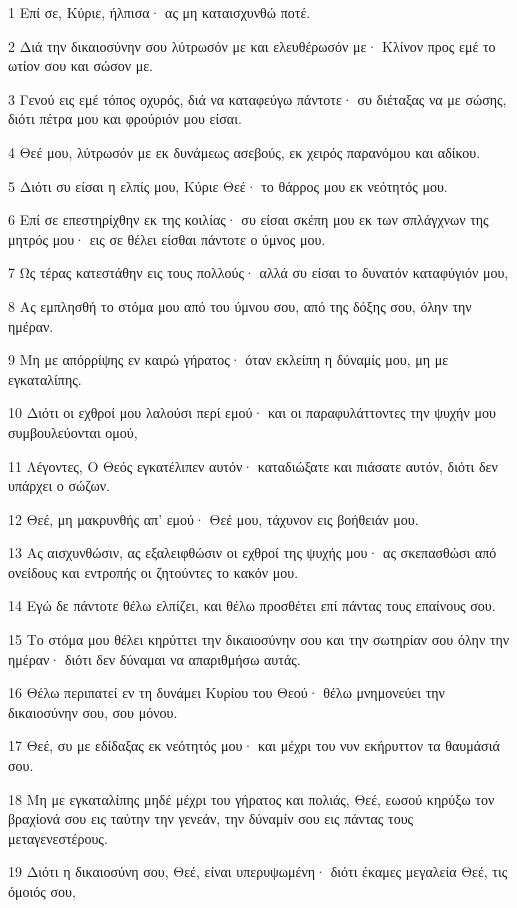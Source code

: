 \par 1 Επί σε, Κύριε, ήλπισα· ας μη καταισχυνθώ ποτέ.
\par 2 Διά την δικαιοσύνην σου λύτρωσόν με και ελευθέρωσόν με· Κλίνον προς εμέ το ωτίον σου και σώσον με.
\par 3 Γενού εις εμέ τόπος οχυρός, διά να καταφεύγω πάντοτε· συ διέταξας να με σώσης, διότι πέτρα μου και φρούριόν μου είσαι.
\par 4 Θεέ μου, λύτρωσόν με εκ δυνάμεως ασεβούς, εκ χειρός παρανόμου και αδίκου.
\par 5 Διότι συ είσαι η ελπίς μου, Κύριε Θεέ· το θάρρος μου εκ νεότητός μου.
\par 6 Επί σε επεστηρίχθην εκ της κοιλίας· συ είσαι σκέπη μου εκ των σπλάγχνων της μητρός μου· εις σε θέλει είσθαι πάντοτε ο ύμνος μου.
\par 7 Ως τέρας κατεστάθην εις τους πολλούς· αλλά συ είσαι το δυνατόν καταφύγιόν μου,
\par 8 Ας εμπλησθή το στόμα μου από του ύμνου σου, από της δόξης σου, όλην την ημέραν.
\par 9 Μη με απόρρίψης εν καιρώ γήρατος· όταν εκλείπη η δύναμίς μου, μη με εγκαταλίπης.
\par 10 Διότι οι εχθροί μου λαλούσι περί εμού· και οι παραφυλάττοντες την ψυχήν μου συμβουλεύονται ομού,
\par 11 Λέγοντες, Ο Θεός εγκατέλιπεν αυτόν· καταδιώξατε και πιάσατε αυτόν, διότι δεν υπάρχει ο σώζων.
\par 12 Θεέ, μη μακρυνθής απ' εμού· Θεέ μου, τάχυνον εις βοήθειάν μου.
\par 13 Ας αισχυνθώσιν, ας εξαλειφθώσιν οι εχθροί της ψυχής μου· ας σκεπασθώσι από ονείδους και εντροπής οι ζητούντες το κακόν μου.
\par 14 Εγώ δε πάντοτε θέλω ελπίζει, και θέλω προσθέτει επί πάντας τους επαίνους σου.
\par 15 Το στόμα μου θέλει κηρύττει την δικαιοσύνην σου και την σωτηρίαν σου όλην την ημέραν· διότι δεν δύναμαι να απαριθμήσω αυτάς.
\par 16 Θέλω περιπατεί εν τη δυνάμει Κυρίου του Θεού· θέλω μνημονεύει την δικαιοσύνην σου, σου μόνου.
\par 17 Θεέ, συ με εδίδαξας εκ νεότητός μου· και μέχρι του νυν εκήρυττον τα θαυμάσιά σου.
\par 18 Μη με εγκαταλίπης μηδέ μέχρι του γήρατος και πολιάς, Θεέ, εωσού κηρύξω τον βραχίονά σου εις ταύτην την γενεάν, την δύναμίν σου εις πάντας τους μεταγενεστέρους.
\par 19 Διότι η δικαιοσύνη σου, Θεέ, είναι υπερυψωμένη· διότι έκαμες μεγαλεία Θεέ, τις όμοιός σου,
